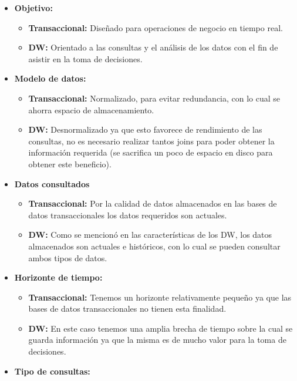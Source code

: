 \documentclass[a4paper,11pt]{article}
\begin{document}
\begin{flushleft}
    
    \begin{itemize}
      \item \textbf{Objetivo:} 
        \begin{itemize}
          \item \textbf{Transaccional:} Diseñado para operaciones de negocio en tiempo real.
          \item \textbf{DW:} Orientado a las consultas y el análisis de los datos con el fin de asistir en la toma de decisiones. 
        \end{itemize}
      \item \textbf{Modelo de datos:}
        \begin{itemize}
          \item \textbf{Transaccional:} Normalizado, para evitar redundancia, con lo cual se ahorra espacio de almacenamiento.
          \item \textbf{DW:} Desnormalizado ya que esto favorece de rendimiento de las consultas, no es necesario realizar tantos joins para poder obtener
          la información requerida (se sacrifica un poco de espacio en disco para obtener este beneficio).
        \end{itemize}
      \item \textbf{Datos consultados}
        \begin{itemize}
          \item \textbf{Transaccional:} Por la calidad de datos almacenados en las bases de datos transaccionales los datos requeridos son actuales.
          \item \textbf{DW:} Como se mencionó en las características de los DW, los datos almacenados son actuales e históricos, con lo cual se pueden
          consultar ambos tipos de datos.
        \end{itemize}
      \item \textbf{Horizonte de tiempo:}
        \begin{itemize}
          \item \textbf{Transaccional:} Tenemos un horizonte relativamente pequeño ya que las bases de datos transaccionales no tienen esta finalidad.
          \item \textbf{DW:} En este caso tenemos una amplia brecha de tiempo sobre la cual se guarda información ya que la misma es de mucho valor para
          la toma de decisiones.
        \end{itemize}
      \item \textbf{Tipo de consultas:}
        \begin{itemize}

\end{itemize}
\end{itemize}
\end{flushleft}
\end{document}
